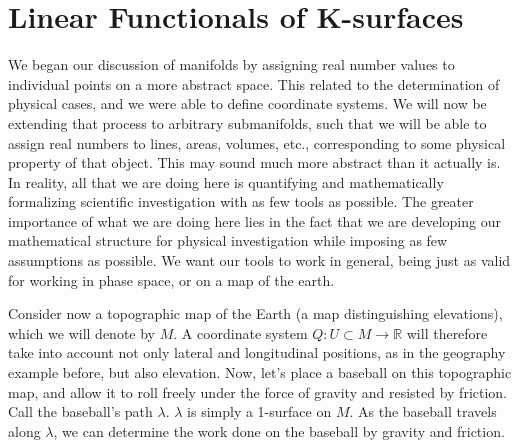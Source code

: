 \documentclass{book}
\begin{document}
\section{Linear Functionals of K-surfaces}







We began our discussion of manifolds by assigning real number values to individual points on a more abstract space. This related to the determination of physical cases, and we were able to define coordinate systems. We will now be extending that process to arbitrary submanifolds, such that we will be able to assign real numbers to lines, areas, volumes, etc., corresponding to some physical property of that object. This may sound much more abstract than it actually is. In reality, all that we are doing here is quantifying and mathematically formalizing scientific investigation with as few tools as possible. The greater importance of what we are doing here lies in the fact that we are developing our mathematical structure for physical investigation while imposing as few assumptions as possible. We want our tools to work in general, being just as valid for working in phase space, or on a map of the earth. 
 
 Consider now a topographic map of the Earth (a map distinguishing elevations), which we will denote by $M$. A coordinate system $Q: U \subset M \to \mathbb{R}$ will therefore take into account not only lateral and longitudinal positions, as in the geography example before, but also elevation. Now, let's place a baseball on this topographic map, and allow it to roll freely under the force of gravity and resisted by friction. Call the baseball's path $\lambda$. $\lambda$ is simply a 1-surface on $M$. As the baseball travels along $\lambda$, we can determine the work done on the baseball by gravity and friction. 
\end{document}
